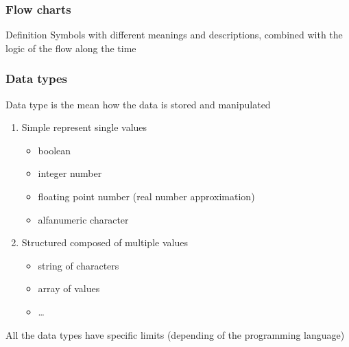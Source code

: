 \begin{frame}
  \frametitle{Flow charts}
  \begin{block}{Definition}
    \alert{Symbols} with different meanings and descriptions,
    \alert{combined} with the logic of the flow along the time
  \end{block}
\end{frame}

\begin{frame}
  \frametitle{Data types}
  \begin{block}{Data type}
    is the mean how the data is stored and manipulated
  \end{block}
  \begin{enumerate}
  \item \alert{Simple} represent single values
    \begin{itemize}
    \item boolean
    \item integer number
    \item floating point number (real number approximation)
    \item alfanumeric character
    \end{itemize}
  \item \alert{Structured} composed of multiple values
    \begin{itemize}
    \item string of characters
    \item array of values
    \item \dots
    \end{itemize}
  \end{enumerate}
  \pause
  All the data types have specific \alert{limits} (depending of the
  programming language)
\end{frame}

